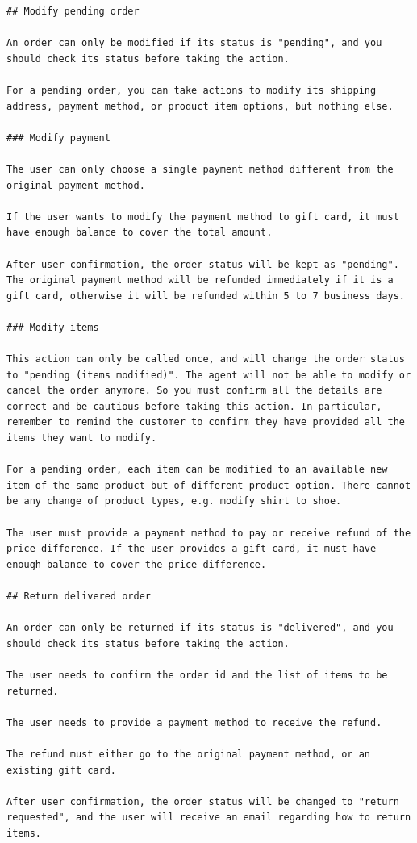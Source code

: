 \begin{lstlisting}
## Modify pending order

An order can only be modified if its status is "pending", and you should check its status before taking the action.

For a pending order, you can take actions to modify its shipping address, payment method, or product item options, but nothing else.

### Modify payment

The user can only choose a single payment method different from the original payment method.

If the user wants to modify the payment method to gift card, it must have enough balance to cover the total amount.

After user confirmation, the order status will be kept as "pending". The original payment method will be refunded immediately if it is a gift card, otherwise it will be refunded within 5 to 7 business days.

### Modify items

This action can only be called once, and will change the order status to "pending (items modified)". The agent will not be able to modify or cancel the order anymore. So you must confirm all the details are correct and be cautious before taking this action. In particular, remember to remind the customer to confirm they have provided all the items they want to modify.

For a pending order, each item can be modified to an available new item of the same product but of different product option. There cannot be any change of product types, e.g. modify shirt to shoe.

The user must provide a payment method to pay or receive refund of the price difference. If the user provides a gift card, it must have enough balance to cover the price difference.

## Return delivered order

An order can only be returned if its status is "delivered", and you should check its status before taking the action.

The user needs to confirm the order id and the list of items to be returned.

The user needs to provide a payment method to receive the refund.

The refund must either go to the original payment method, or an existing gift card.

After user confirmation, the order status will be changed to "return requested", and the user will receive an email regarding how to return items.


\end{lstlisting}
